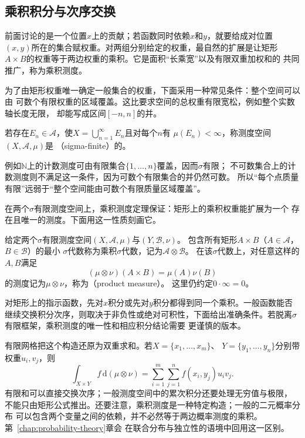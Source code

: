 \subsection{乘积积分与次序交换}

前面讨论的是一个位置$x$上的贡献；若函数同时依赖$x$和$y$，就要给成对位置
$(x,y)$所在的集合赋权重。对两组分别给定的权重，最自然的扩展是让矩形
$A\times B$的权重等于两边权重的乘积。它是面积“长乘宽”以及有限双重加权和的
共同推广，称为乘积测度。

为了由矩形权重唯一确定一般集合的权重，下面采用一种常见条件：整个空间可以由
可数个有限权重的区域覆盖。这比要求空间的总权重有限宽松，例如整个实数轴长度无限，
却能写成区间$[-n,n]$的并。
\begin{definition}
\label{def:analysis-sigma-finite-measure}
若存在$E_n\in\mathcal{A}$，使$X=\bigcup_{n=1}^{\infty}E_n$且对每个$n$有
$\mu(E_n)<\infty$，称测度空间$(X,\mathcal{A},\mu)$是
（sigma-finite）的。
\end{definition}
例如$\mathbb N$上的计数测度可由有限集合$\{1,\ldots,n\}$覆盖，因而$\sigma$有限；
不可数集合上的计数测度则不满足这一条件，因为可数个有限集合的并仍然可数。
所以“每个点质量有限”远弱于“整个空间能由可数个有限质量区域覆盖”。

在两个$\sigma$有限测度空间上，乘积测度定理保证：矩形上的乘积权重能扩展为一个
存在且唯一的测度。下面用这一性质刻画它。
\begin{definition}
\label{def:analysis-product-measure}
给定两个$\sigma$有限测度空间$(X,\mathcal{A},\mu)$与$(Y,\mathcal{B},\nu)$。
包含所有矩形$A\times B$（$A\in\mathcal{A}$，$B\in\mathcal{B}$）的最小
$\sigma$代数称为乘积$\sigma$代数，记为$\mathcal{A}\otimes\mathcal{B}$。
在该$\sigma$代数上，对任意这样的$A,B$满足
\[   (\mu\otimes\nu)(A\times B)=\mu(A)\nu(B) \]
的测度记为$\mu\otimes\nu$，称为（product measure）。
这里仍约定$0\cdot\infty=0$。
\end{definition}
对矩形上的指示函数，先对$x$积分或先对$y$积分都得到同一个乘积。一般函数能否继续交换积分次序，则取决于非负性或绝对可积性，下面给出准确条件。若脱离$\sigma$有限框架，乘积测度的唯一性和相应积分结论需要
更谨慎的版本。

有限网格把这个构造还原为双重求和。若$X=\{x_1,\ldots,x_m\}$、
$Y=\{y_1,\ldots,y_n\}$分别带权重$u_i,v_j$，则
\[
  \int_{X\times Y}f\,\mathrm{d}(\mu\otimes\nu)
  =
  \sum_{i=1}^m\sum_{j=1}^n f(x_i,y_j)u_iv_j.
\]
有限和可以直接交换次序；一般测度空间中的累次积分还要处理无穷值与极限，
不能只由矩形公式推出。还要注意，乘积测度是一种特定构造；一般的二元概率分布
可以包含两个变量之间的依赖，并不必然等于两边概率测度的乘积。第~\ref{chap:probability-theory}章会
在联合分布与独立性的语境中回用这一区别。

